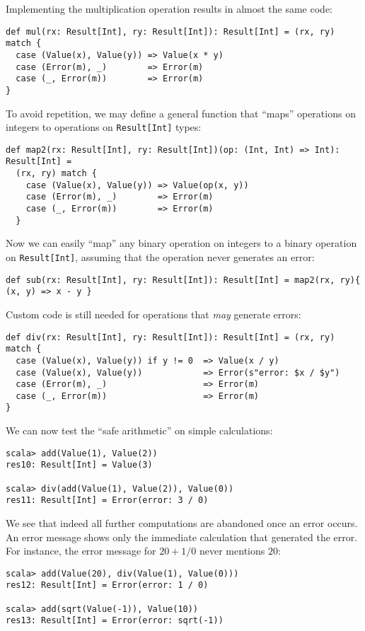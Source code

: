 Implementing the multiplication operation results in almost the same
code:
\begin{lstlisting}
def mul(rx: Result[Int], ry: Result[Int]): Result[Int] = (rx, ry) match {
  case (Value(x), Value(y)) => Value(x * y)
  case (Error(m), _)        => Error(m)
  case (_, Error(m))        => Error(m)
}
\end{lstlisting}
To avoid repetition, we may define a general function that ``maps''
operations on integers to operations on \lstinline!Result[Int]! types:
\begin{lstlisting}
def map2(rx: Result[Int], ry: Result[Int])(op: (Int, Int) => Int): Result[Int] =
  (rx, ry) match {
    case (Value(x), Value(y)) => Value(op(x, y))
    case (Error(m), _)        => Error(m)
    case (_, Error(m))        => Error(m)
  }
\end{lstlisting}
Now we can easily ``map'' any binary operation on integers to a
binary operation on \lstinline!Result[Int]!, assuming that the operation
never generates an error:
\begin{lstlisting}
def sub(rx: Result[Int], ry: Result[Int]): Result[Int] = map2(rx, ry){ (x, y) => x - y }
\end{lstlisting}
 Custom code is still needed for operations that \emph{may} generate
errors:
\begin{lstlisting}
def div(rx: Result[Int], ry: Result[Int]): Result[Int] = (rx, ry) match {
  case (Value(x), Value(y)) if y != 0  => Value(x / y)
  case (Value(x), Value(y))            => Error(s"error: $x / $y")
  case (Error(m), _)                   => Error(m)
  case (_, Error(m))                   => Error(m)
}
\end{lstlisting}
We can now test the ``safe arithmetic'' on simple calculations:
\begin{lstlisting}
scala> add(Value(1), Value(2))
res10: Result[Int] = Value(3)

scala> div(add(Value(1), Value(2)), Value(0))
res11: Result[Int] = Error(error: 3 / 0)
\end{lstlisting}
We see that indeed all further computations are abandoned once an
error occurs. An error message shows only the immediate calculation
that generated the error. For instance, the error message for $20+1/0$
never mentions $20$:
\begin{lstlisting}
scala> add(Value(20), div(Value(1), Value(0)))
res12: Result[Int] = Error(error: 1 / 0)

scala> add(sqrt(Value(-1)), Value(10))
res13: Result[Int] = Error(error: sqrt(-1))
\end{lstlisting}



